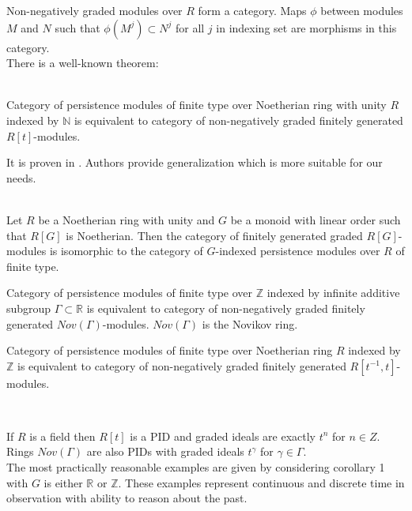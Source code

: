 Non-negatively graded modules over $R$ form a category. Maps $\phi$ between modules $M$ and $N$ such that $\phi(M^j) \subset N^j$ for all $j$ in indexing set are morphisms in this category.\\

There is a well-known theorem:

\begin{theorem} {\cite[Theorem 3.1]{Zomorodian05}}\\
  Category of persistence modules of finite type over Noetherian ring with unity $R$ indexed by $\mathbb{N}$ is equivalent to category of non-negatively graded finitely generated $R[t]$-modules.
\end{theorem}

It is proven in {\cite{Corbet18}}. Authors provide generalization {\cite[Theorem 2]{Corbet18}} which is more suitable for our needs.\\

\begin{theorem} {\cite[Case of Corollary 20 of Theorem 2]{Corbet18}}\\
  Let $R$ be a Noetherian ring with unity and $G$ be a monoid with linear order such that $R[G]$ is Noetherian. Then the category of finitely generated graded $R[G]$-modules is isomorphic to the category of $G$-indexed persistence modules over $R$ of finite type.
\end{theorem}

\begin{corollary}
  Category of persistence modules of finite type over $\mathbb{Z}$ indexed by infinite additive subgroup $\Gamma \subset \mathbb{R}$ is equivalent to category of non-negatively graded finitely generated $Nov(\Gamma)$-modules. $Nov(\Gamma)$ is the Novikov ring.
\end{corollary}

\begin{corollary}
  Category of persistence modules of finite type over Noetherian ring $R$ indexed by $\mathbb{Z}$ is equivalent to category of non-negatively graded finitely generated $R[t^{-1},t]$-modules.
\end{corollary}

\begin{remark} ~ \par
  If $R$ is a field then $R[t]$ is a PID and graded ideals are exactly $t^n$ for $n \in Z$.\\
  Rings $Nov(\Gamma)$ are also PIDs with graded ideals $t^{\gamma}$ for $\gamma \in \Gamma$.\\

  The most practically reasonable examples are given by considering corollary 1 with $G$ is either $\mathbb{R}$ or $\mathbb{Z}$. These examples represent continuous and discrete time in observation with ability to reason about the past.
\end{remark}

